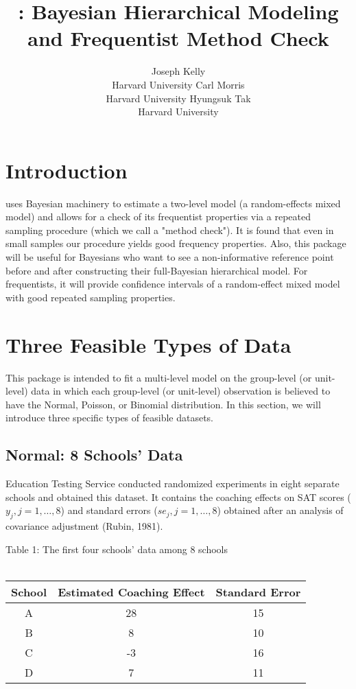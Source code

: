 \documentclass[article]{jss}
\author{Joseph Kelly\\Harvard University \And 
             Carl Morris\\ Harvard University\And
             Hyungsuk Tak\\Harvard University }
\title{\pkg{Rgbp}: Bayesian Hierarchical Modeling and Frequentist Method Check}
\begin{document}

\section[introduction]{Introduction}
 uses Bayesian machinery to estimate a two-level model (a random-effects mixed model) and allows for a check of its frequentist properties via a repeated sampling procedure (which we call a "method check"). It is found that even in small samples our procedure yields good frequency properties. Also, this package will be useful for Bayesians who want to see a non-informative reference point before and after constructing their full-Bayesian hierarchical model. For frequentists, it will provide confidence intervals of a random-effect mixed model with good repeated sampling properties.

\section[Feasible Data Types]{Three Feasible Types of Data }
This package is intended to fit a multi-level model on the group-level (or unit-level) data in which each group-level (or unit-level) observation is believed to have the Normal, Poisson, or Binomial distribution. In this section, we will introduce three specific types of feasible datasets.

\subsection{Normal: 8 Schools' Data}
Education Testing Service conducted randomized experiments in eight separate schools and obtained this dataset. It contains the coaching effects on SAT scores ($y_{j}, j=1, \ldots, 8$) and standard errors ($se_{j}, j=1, \ldots, 8$) obtained after an analysis of covariance adjustment (Rubin, 1981).
\begin{center}
Table 1: The first four schools' data among 8 schools
\\
~
\\
\begin{tabular}{|c|c|c|}
\hline
School & Estimated Coaching Effect & Standard Error\\
\hline
A & 28 & 15\\
\hline
B & 8 & 10\\
\hline
C & -3 & 16\\
\hline
D & 7 & 11\\
\hline
\end{tabular}
\end{center}
~
\end{document}
